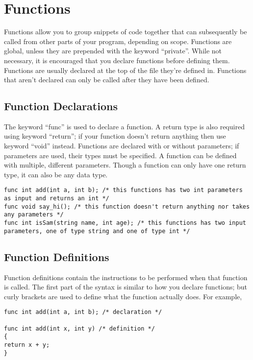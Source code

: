 \documentclass{article}
\begin{document}
\section{Functions}
Functions allow you to group snippets of code together that can subsequently be called from other parts of your program, depending on scope. Functions are global, unless they are prepended with the keyword ``private''. While not necessary, it is encouraged that you declare functions before defining them. Functions are usually declared at the top of the file they're defined in. Functions that aren't declared can only be called after they have been defined. 

\subsection{Function Declarations}

The keyword ``func'' is used to declare a function. A return type is also required using keyword ``return''; if your function doesn't return anything then use keyword ``void'' instead.  Functions are declared with or without parameters; if parameters are used, their types must be specified. A function can be defined with multiple, different parameters. Though a function can only have one return type, it can also be any data type. 

\begin{lstlisting}
func int add(int a, int b); /* this functions has two int parameters as input and returns an int */
func void say_hi(); /* this function doesn't return anything nor takes any parameters */
func int isSam(string name, int age); /* this functions has two input parameters, one of type string and one of type int */

\end{lstlisting}

\subsection{Function Definitions}
Function definitions contain the instructions to be performed when that function is called. The first part of the syntax is similar to how you declare functions; but curly brackets are used to define what the function actually does. For example, 

\begin{lstlisting}
func int add(int a, int b); /* declaration */

func int add(int x, int y) /* definition */
{
return x + y;
}
\end{lstlisting}
\end{document}
